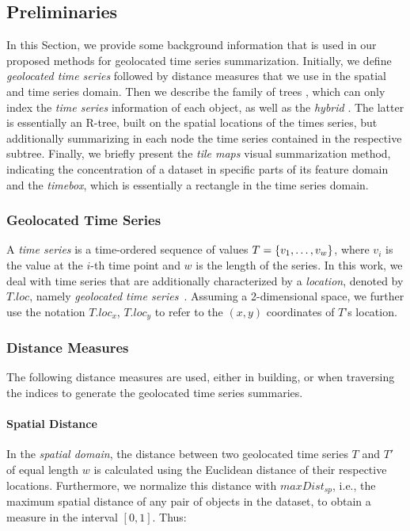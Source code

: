 \subsection{Preliminaries}
\label{sec:preliminaries}

In this Section, we provide some background information that is used in our proposed methods for geolocated time series summarization. Initially, we define {\em geolocated time series} followed by distance measures that we use in the spatial and time series domain. Then we describe the \isax family of trees \cite{shieh2008kdd,camerra2010icdm,camerra2014kais}, which can only index the {\em time series} information of each object, as well as the {\em hybrid} \btsr \cite{chatzig17btsr}. The latter is essentially an R-tree, built on the spatial locations of the times series, but additionally summarizing in each node the time series contained in the respective subtree. Finally, we briefly present the {\em tile maps} visual summarization method, indicating the concentration of a dataset in specific parts of its feature domain and the {\em timebox}, which is essentially a rectangle in the time series domain.

\subsubsection{Geolocated Time Series}
\label{subsec:geoTS}
A {\em time series} is a time-ordered sequence of values $T = \{v_1, \ldots, \\v_w\}$, where $v_i$ is the value at the $i$-th time point and $w$ is the length of the series. In this work, we deal with time series that are additionally characterized by a \emph{location}, denoted by $T.loc$, namely {\em geolocated time series}~\cite{chatzig17btsr}. Assuming a 2-dimensional space, we further use the notation $T.loc_x$, $T.loc_y$ to refer to the $(x,y)$ coordinates of $T$'s location. 

\subsubsection{Distance Measures}
\label{subsec:dist_meas}
The following distance measures are used, either in building, or when traversing the indices to generate the geolocated time series summaries.

\paragraph{Spatial Distance} In the {\em spatial domain}, the distance between two geolocated time series $T$ and $T'$ of equal length $w$ is calculated using the Euclidean distance of their respective locations. Furthermore, we normalize this distance with $maxDist_{sp}$, i.e., the maximum spatial distance of any pair of objects in the dataset, to obtain a measure in the interval $[0,1]$. Thus:

